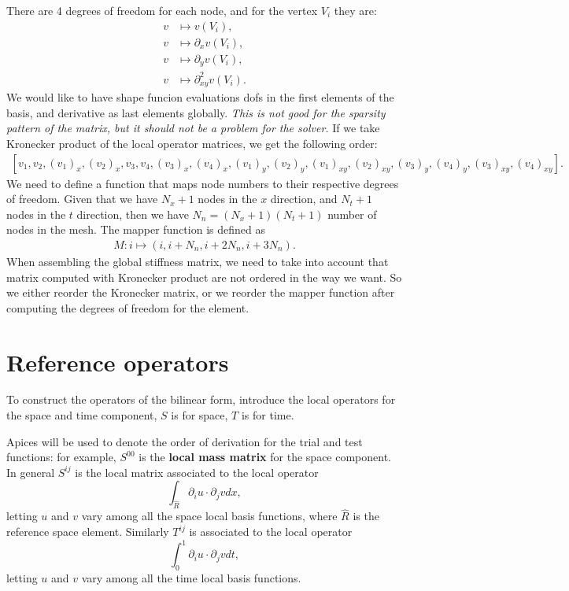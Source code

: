 \documentclass[]{report}
\begin{document}
    There are 4 degrees of freedom for each node, and for the vertex $V_i$ they are:
    \begin{align*}
        v &\mapsto v(V_i), \\
        v &\mapsto \partial_x v(V_i), \\
        v &\mapsto \partial_y v(V_i), \\
        v &\mapsto \partial^2_{xy} v(V_i).
    \end{align*}
    We would like to have shape funcion evaluations dofs in the first elements of the basis, and derivative as last elements globally. 
    {\itshape This is not good for the sparsity pattern of the matrix, but it should not be a problem for the solver.}
    If we take Kronecker product of the local operator matrices, we get the following order:
    \begin{align*}
        \left[
            v_1, v_2, (v_1)_x, (v_2)_x,
            v_3, v_4, (v_3)_x, (v_4)_x,
            (v_1)_y, (v_2)_y, (v_1)_{xy}, (v_2)_{xy},
            (v_3)_y, (v_4)_y, (v_3)_{xy}, (v_4)_{xy}
            \right].
    \end{align*}
    We need to define a function that maps node numbers to their respective degrees of freedom. Given that we have $N_x + 1$ nodes in the $x$ direction, and $N_t + 1$ nodes in the $t$ direction, then we have $N_n = (N_x + 1) (N_t + 1)$ number of nodes in the mesh. The mapper function is defined as
    \begin{align*}
        M: i \mapsto (i, i + N_n, i + 2 N_n, i + 3 N_n).
    \end{align*}
    When assembling the global stiffness matrix, we need to take into account that matrix computed with Kronecker product are not ordered in the way we want. {\color{red} So we either reorder the Kronecker matrix, or we reorder the mapper function after computing the degrees of freedom for the element.}
    
    \section*{Reference operators}
    To construct the operators of the bilinear form, introduce the local operators for the space and time component, $S$ is for space, $T$ is for time. 

    
    Apices will be used to denote the order of derivation for the trial and test functions: for example, $S^{00}$ is the \textbf{local mass matrix} for the space component. In general $S^{ij}$ is the local matrix associated to the local operator
    \begin{equation*}
        \int_{\hat{R}} \partial_i u \cdot \partial_j v dx,
    \end{equation*}
    letting $u$ and $v$ vary among all the space local basis functions, where $\hat{R}$ is the reference space element.
    Similarly $T^{ij}$ is associated to the local operator 
    \begin{equation*}
        \int_0^1 \partial_i u \cdot \partial_j v dt,
    \end{equation*}
    letting $u$ and $v$ vary among all the time local basis functions.
    
\end{document}
